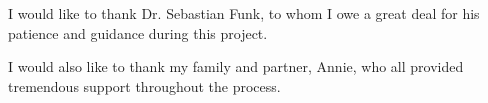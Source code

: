 \documentclass[../Paper.tex]{subfiles}
\begin{document}
  \justifying
  I would like to thank Dr. Sebastian Funk, to whom I owe a great deal for his
  patience and guidance during this project.

  I would also like to thank my family and partner, Annie, who all provided
  tremendous support throughout the process.
  \clearpage
\end{document}
